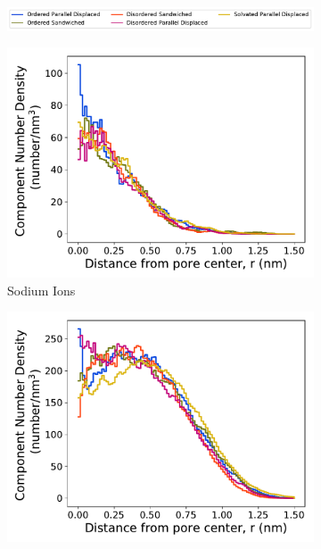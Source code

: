 \documentclass[journal=jpcbfk,manuscript=article]{achemso}
\begin{document}
  \begin{figure}[!htb]
  \centering
  \begin{subfigure}{\textwidth}
  \includegraphics[width=\textwidth]{regional_density_legend.pdf}
  \end{subfigure}
  \begin{subfigure}{0.32\textwidth}
        \includegraphics[width=1\linewidth]{sodium_density.pdf}
        \caption{Sodium Ions}
        \label{fig:sodium_regional_density}
  \end{subfigure}
  \begin{subfigure}{0.32\textwidth}
        \includegraphics[width=1\linewidth]{head_group_density.pdf}

\end{subfigure}
\end{figure}
\end{document}
